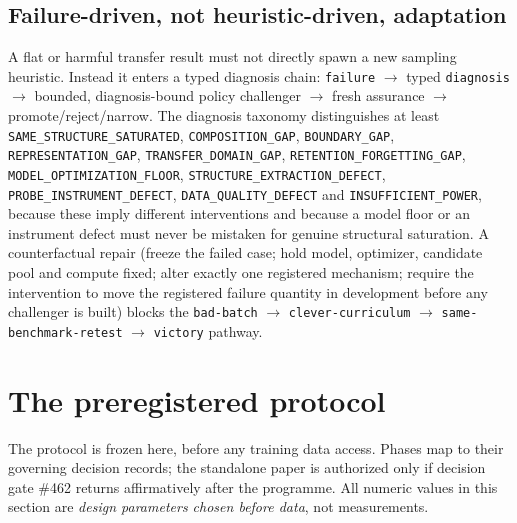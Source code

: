 \documentclass[11pt]{article}
\newcommand{\code}[1]{\texttt{#1}}
\begin{document}
\subsection{Failure-driven, not heuristic-driven, adaptation}
A flat or harmful transfer result must not directly spawn a new sampling heuristic. Instead it enters a typed diagnosis chain: \code{failure} $\to$ typed \code{diagnosis} $\to$ bounded, diagnosis-bound policy challenger $\to$ fresh assurance $\to$ promote/reject/narrow. The diagnosis taxonomy distinguishes at least \code{SAME\_STRUCTURE\_SATURATED}, \code{COMPOSITION\_GAP}, \code{BOUNDARY\_GAP}, \code{REPRESENTATION\_GAP}, \code{TRANSFER\_DOMAIN\_GAP}, \code{RETENTION\_FORGETTING\_GAP}, \code{MODEL\_OPTIMIZATION\_FLOOR}, \code{STRUCTURE\_EXTRACTION\_DEFECT}, \code{PROBE\_INSTRUMENT\_DEFECT}, \code{DATA\_QUALITY\_DEFECT} and \code{INSUFFICIENT\_POWER}, because these imply different interventions and because a model floor or an instrument defect must never be mistaken for genuine structural saturation. A counterfactual repair (freeze the failed case; hold model, optimizer, candidate pool and compute fixed; alter exactly one registered mechanism; require the intervention to move the registered failure quantity in development before any challenger is built) blocks the \code{bad-batch} $\to$ \code{clever-curriculum} $\to$ \code{same-benchmark-retest} $\to$ \code{victory} pathway.

\section{The preregistered protocol}
\label{sec:protocol}

The protocol is frozen here, before any training data access. Phases map to their governing decision records; the standalone paper is authorized only if decision gate \#462 returns affirmatively after the programme. All numeric values in this section are \emph{design parameters chosen before data}, not measurements.
\end{document}

